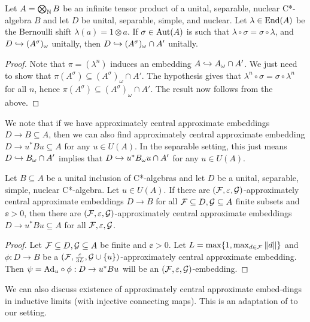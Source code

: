 \documentclass[12pt]{amsart}
\begin{document}
\begin{cor}\label{autfixedpoint}
  Let $A = \bigotimes_{\mathbb{N}} B$ be an infinite tensor product of a unital, separable, nuclear C*-algebra $B$ and let $D$ be unital, separable, simple, and nuclear. Let $\lambda \in \operatorname{End}(A)$ be the Bernoulli shift $\lambda(a) = 1 \otimes a$. If $\sigma \in \operatorname{Aut}(A)$ is such that $\lambda \circ \sigma  = \sigma \circ \lambda$, and $D \hookrightarrow (A^\sigma)_\omega$ unitally, then $D \hookrightarrow (A^\sigma)_\omega \cap A'$ unitally. 
              \begin{proof}
                Note that $\pi = (\lambda^n)$ induces an embedding $A \hookrightarrow A_\omega \cap A'$. We just need to show that $\pi(A^\sigma) \subseteq (A^\sigma)_\omega \cap A'$. The hypothesis gives that $\lambda^n \circ \sigma = \sigma \circ \lambda^n$ for all $n$, hence $\pi(A^\sigma) \subseteq (A^\sigma)_\omega \cap A'$. The result now follows from the above. 
              \end{proof}
          \end{cor}

  We note that if we have approximately central approximate embeddings $D \to B \subseteq A$, then we can also find approximately central approximate embedding $D \to u^*Bu \subseteq A$ for any $u \in U(A)$. In the separable setting, this just means $D \hookrightarrow B_\omega \cap A'$ implies that $D \hookrightarrow u^*B_\omega u \cap A'$ for any $u \in U(A)$. 

  \begin{lemma}\label{aduaapproximateembeddings}
    Let $B \subseteq A$ be a unital inclusion of C*-algebras and let $D$ be a unital, separable, simple, nuclear C*-algebra. Let $u \in U(A)$. If there are $(\mathcal{F},\varepsilon,\mathcal{G})$-approximately central approximate embeddings $D \to B$ for all $\mathcal{F} \subseteq D, \mathcal{G} \subseteq A$ finite subsets and $\ee > 0$, then there are $(\mathcal{F},\varepsilon,\mathcal{G})$-approximately central approximate embeddings $D \to u^*Bu \subseteq A$ for all $\mathcal{F},\varepsilon,\mathcal{G}$.
      \begin{proof}
        Let $\mathcal{F} \subseteq D, \mathcal{G} \subseteq A$ be finite and $\ee > 0$. Let $L = \max\{1,\max_{d \in \mathcal{F}}\|d\|\}$ and $\phi: D \to B$ be a $(\mathcal{F},\frac{\varepsilon}{3L},\mathcal{G} \cup \{u\})$-approximately central approximate embedding. Then $\psi = \text{Ad}_u \circ \phi: D \to u^*Bu$ will be an $(\mathcal{F},\varepsilon,\mathcal{G})$-embedding. 
      \end{proof}
  \end{lemma}

  We can also discuss existence of approximately central approximate embed\hyp{}dings in inductive limits (with injective connecting maps). This is an adaptation of \cite[Proposition 2.2]{TomsWinter08} to our setting. 
\end{document}
